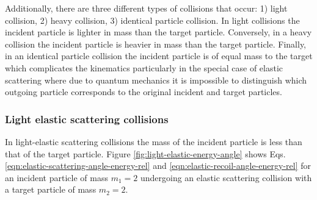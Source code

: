 \documentclass[../main.tex]{subfiles}
\begin{document}
Additionally, there are three different types of collisions that occur: 1) light collision, 2) heavy collision, 3) identical particle collision. In light collisions the incident particle is lighter in mass than the target particle. Conversely, in a heavy collision the incident particle is heavier in mass than the target particle. Finally, in an identical particle collision the incident particle is of equal mass to the target which complicates the kinematics particularly in the special case of elastic scattering where due to quantum mechanics it is impossible to distinguish which outgoing particle corresponds to the original incident and target particles.

\subsubsection{Light elastic scattering collisions}
In light-elastic scattering collisions the mass of the incident particle is less than that of the target particle. Figure \ref{fig:light-elastic-energy-angle} shows Eqs. \eqref{eqn:elastic-scattering-angle-energy-rel}  and \eqref{eqn:elastic-recoil-angle-energy-rel} for an incident particle of mass $m_1 = 2$ undergoing an elastic scattering collision with a target particle of mass $m_2 = 2$. 
\end{document}
